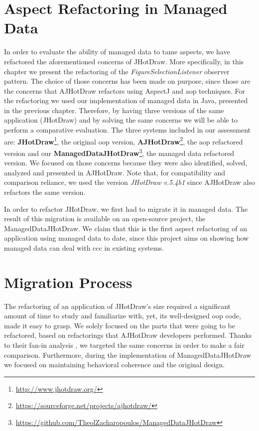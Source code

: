 \section{Aspect Refactoring in Managed Data}
In order to evaluate the ability of managed data to tame aspects, we have refactored the aforementioned concerns of JHotDraw.
More specifically, in this chapter we present the refactoring of the \textit{FigureSelectionListener} observer pattern.
The choice of those concerns has been made on purpose, since those are the concerns that AJHotDraw refactors using AspectJ and \ac{aop} techniques.
For the refactoring we used our implementation of managed data in Java, presented in the previous chapter.
Therefore, by having three versions of the same application (JHotDraw) and by solving the same concerns we will be able to perform a comparative evaluation.
The three systems included in our assessment are: \textbf{JHotDraw}\footnote{\url{http://www.jhotdraw.org/}}, the original \ac{oop} version, \textbf{AJHotDraw}\footnote{\url{https://sourceforge.net/projects/ajhotdraw/}}, the \ac{aop} refactored version and our \textbf{ManagedDataJHotDraw}\footnote{\url{https://github.com/TheolZacharopoulos/ManagedDataJHotDraw}}, the managed data refactored version.
We focused on those concerns because they were also identified, solved, analyzed and presented in AJHotDraw.
Note that, for compatibility and comparison reliance, we used the version \textit{JHotDraw v.5.4b1} since AJHotDraw also refactors the same version.

In order to refactor JHotDraw, we first had to migrate it in managed data.
The result of this migration is available on an open-source project, the ManagedDataJHotDraw.
We claim that this is the first aspect refactoring of an application using managed data to date, since this project aims on showing how managed data can deal with \ac{ccc} in existing systems.

\section{Migration Process}
The refactoring of an application of JHotDraw's size required a significant amount of time to study and familiarize with, yet, its well-designed \ac{oop} code, made it easy to grasp.
We solely focused on the parts that were going to be refactored, based on refactorings that AJHotDraw developers \cite{marinajhotdraw} performed.
Thanks to their fan-in analysis \cite{marin2004identifying}, we targeted the same concerns in order to make a fair comparison.
Furthermore, during the implementation of ManagedDataJHotDraw we focused on maintaining behavioral coherence and the original design.


